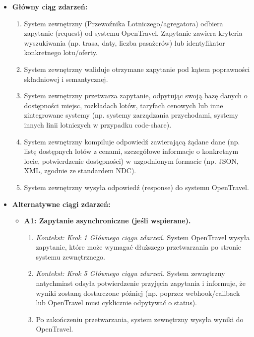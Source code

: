 \documentclass[a4paper,12pt]{article}
\begin{document}
\begin{itemize}
\begin{itemize}
        \end{itemize}
    \item \textbf{Główny ciąg zdarzeń:}
        \begin{enumerate}
            \item System zewnętrzny (Przewoźnika Lotniczego/agregatora) odbiera zapytanie (request) od systemu OpenTravel. Zapytanie zawiera kryteria wyszukiwania (np. trasa, daty, liczba pasażerów) lub identyfikator konkretnego lotu/oferty.
            \item System zewnętrzny waliduje otrzymane zapytanie pod kątem poprawności składniowej i semantycznej.
            \item System zewnętrzny przetwarza zapytanie, odpytując swoją bazę danych o dostępności miejsc, rozkładach lotów, taryfach cenowych lub inne zintegrowane systemy (np. systemy zarządzania przychodami, systemy innych linii lotniczych w przypadku code-share).
            \item System zewnętrzny kompiluje odpowiedź zawierającą żądane dane (np. listę dostępnych lotów z cenami, szczegółowe informacje o konkretnym locie, potwierdzenie dostępności) w uzgodnionym formacie (np. JSON, XML, zgodnie ze standardem NDC).
            \item System zewnętrzny wysyła odpowiedź (response) do systemu OpenTravel.
        \end{enumerate}
    \item \textbf{Alternatywne ciągi zdarzeń:}
        \begin{itemize}
            \item \textbf{A1: Zapytanie asynchroniczne (jeśli wspierane).}
                \begin{enumerate}
                    \item \textit{Kontekst: Krok 1 Głównego ciągu zdarzeń.} System OpenTravel wysyła zapytanie, które może wymagać dłuższego przetwarzania po stronie systemu zewnętrznego.
                    \item \textit{Kontekst: Krok 5 Głównego ciągu zdarzeń.} System zewnętrzny natychmiast odsyła potwierdzenie przyjęcia zapytania i informuje, że wyniki zostaną dostarczone później (np. poprzez webhook/callback lub OpenTravel musi cyklicznie odpytywać o status).
                    \item Po zakończeniu przetwarzania, system zewnętrzny wysyła wyniki do OpenTravel.
                \end{enumerate}
        \end{itemize}

\end{itemize}
\end{document}
